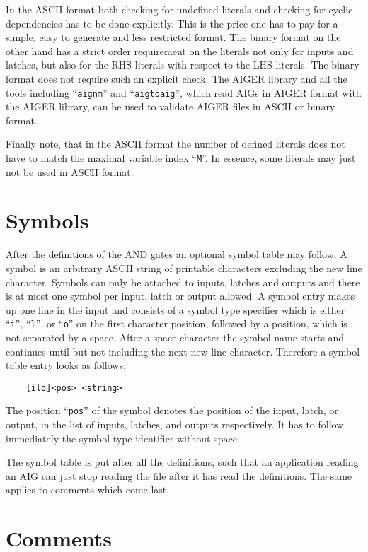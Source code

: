 \documentclass[10pt]{llncs}
\begin{document}
  In the ASCII format both checking for undefined literals and checking for
  cyclic dependencies has to be done explicitly.  This is the price one has
  to pay for a simple, easy to generate and less restricted format.  The
  binary format on the other hand has a strict order requirement on the
  literals not only for inputs and latches, but also for the RHS literals
  with respect to the LHS literals.  The binary format does not require such
  an explicit check. The AIGER library and all the tools including
  ``\texttt{aignm}''
  and ``\texttt{aigtoaig}'', which read AIGs in AIGER format with the AIGER library,
  can be used to validate AIGER files in ASCII or binary format.

  Finally note, that in the ASCII format the number of defined literals does
  not have to match the maximal variable index ``\texttt{M}''.  In essence, some
  literals may just not be used in ASCII format.

\section{Symbols}
  
  After the definitions of the AND gates an optional symbol table may
  follow.  A symbol is an arbitrary ASCII string of printable characters
  excluding the new line character.  Symbols can only be attached to inputs,
  latches and outputs and there is at most one symbol per input, latch or
  output allowed.  A symbol entry makes up one line in the input and
  consists of a symbol type specifier which is either ``\texttt{i}'',
  ``\texttt{l}'', or ``\texttt{o}'' on
  the first character position, followed by a position, which is not
  separated by a space.  After a space character the symbol name starts and
  continues until but not including the next new line character.  Therefore
  a symbol table entry looks as follows:
\begin{verbatim}
    [ilo]<pos> <string>
\end{verbatim}
  The position ``\texttt{pos}'' of the symbol denotes the position of the input, latch,
  or output, in the list of inputs, latches, and outputs respectively.  It
  has to follow immediately the symbol type identifier without space.

  The symbol table is put after all the definitions, such that an
  application reading an AIG can just stop reading the file after it has
  read the definitions.  The same applies to comments which come last.

\section{Comments}
 
\end{document}
